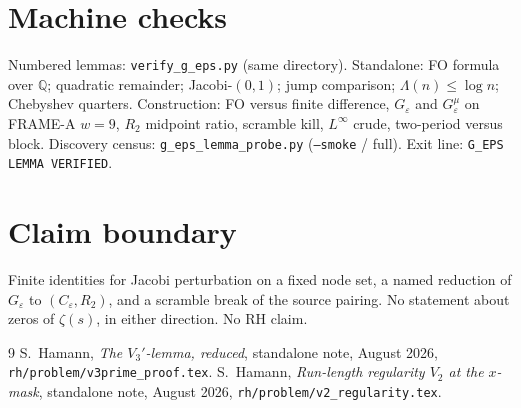 \documentclass[11pt]{article}
\theoremstyle{remark}
\newcommand{\Q}{\mathbb{Q}}
\begin{document}
\section{Machine checks}\label{sec:machine}

Numbered lemmas: \texttt{verify\_g\_eps.py} (same directory).
Standalone: FO formula over $\Q$; quadratic remainder;
Jacobi-$(0,1)$; jump comparison; $\Lambda(n)\le\log n$;
Chebyshev quarters.
Construction: FO versus finite difference, $G_\varepsilon$ and
$G_\varepsilon^\mu$ on FRAME-A $w=9$, $R_2$ midpoint ratio,
scramble kill, $L^\infty$ crude, two-period versus block.
Discovery census: \texttt{g\_eps\_lemma\_probe.py}
(\texttt{--smoke} / full).
Exit line: \texttt{G\_EPS LEMMA VERIFIED}.

\section*{Claim boundary}

Finite identities for Jacobi perturbation on a fixed node set,
a named reduction of $G_\varepsilon$ to $(C_\varepsilon,R_2)$,
and a scramble break of the source pairing.
No statement about zeros of $\zeta(s)$, in either direction.
No RH claim.

\begin{thebibliography}{9}
S.~Hamann,
\textit{The $V_3'$-lemma, reduced},
standalone note, August 2026,
\texttt{rh/problem/v3prime\_proof.tex}.
S.~Hamann,
\textit{Run-length regularity $V_2$ at the $x$-mask},
standalone note, August 2026,
\texttt{rh/problem/v2\_regularity.tex}.
\end{thebibliography}
\end{document}

